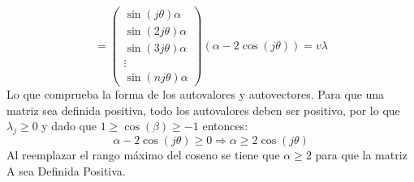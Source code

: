 $$
    =
     \begin{pmatrix}
    \sin(j\theta)\alpha\\
    \sin(2j\theta)\alpha\\
    \sin(3j\theta)\alpha\\
    \vdots\\
    \sin(nj\theta)\alpha
    \end{pmatrix}(\alpha-2\cos(j\theta))=v\lambda
$$
Lo que comprueba la forma de los autovalores y autovectores. Para que una matriz sea definida positiva, todo los autovalores deben ser positivo, por lo que $\lambda_j \geq 0$ y dado que $1 \geq \cos(\beta) \geq -1$ entonces:\\
$$
\alpha-2\cos(j\theta) \geq 0 \Rightarrow \alpha \geq 2\cos(j\theta)
$$
Al reemplazar el rango máximo del coseno se tiene que $\alpha \geq 2$ para que la matriz A sea Definida Positiva.
